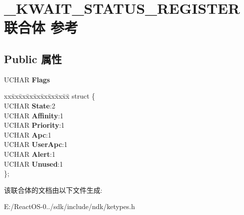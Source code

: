 \hypertarget{union___k_w_a_i_t___s_t_a_t_u_s___r_e_g_i_s_t_e_r}{}\section{\+\_\+\+K\+W\+A\+I\+T\+\_\+\+S\+T\+A\+T\+U\+S\+\_\+\+R\+E\+G\+I\+S\+T\+E\+R联合体 参考}
\label{union___k_w_a_i_t___s_t_a_t_u_s___r_e_g_i_s_t_e_r}
\subsection*{Public 属性}
\begin{DoxyCompactItemize}
\item 
\mbox{\label{union___k_w_a_i_t___s_t_a_t_u_s___r_e_g_i_s_t_e_r_ab24f7e75c3b78ea90247d7d57d6eb1cc}} 
U\+C\+H\+AR {\bfseries Flags}
\item 
\mbox{\label{union___k_w_a_i_t___s_t_a_t_u_s___r_e_g_i_s_t_e_r_ade609a406f7b7df2b01cf1c9cd2aff0b}} 
\begin{tabbing}
xx\=xx\=xx\=xx\=xx\=xx\=xx\=xx\=xx\=\kill
struct \{\\
\>UCHAR {\bfseries State}:2\\
\>UCHAR {\bfseries Affinity}:1\\
\>UCHAR {\bfseries Priority}:1\\
\>UCHAR {\bfseries Apc}:1\\
\>UCHAR {\bfseries UserApc}:1\\
\>UCHAR {\bfseries Alert}:1\\
\>UCHAR {\bfseries Unused}:1\\
\}; \\

\end{tabbing}\end{DoxyCompactItemize}


该联合体的文档由以下文件生成\+:\begin{DoxyCompactItemize}
\item 
E\+:/\+React\+O\+S-\/0../sdk/include/ndk/ketypes.\+h\end{DoxyCompactItemize}
